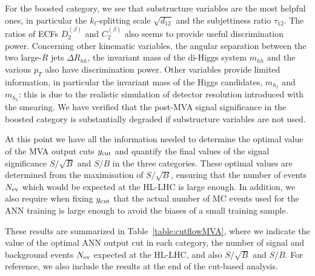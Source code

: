 For the boosted category, we see that substructure variables
are the most helpful ones, in particular the $k_t$-splitting scale
$\sqrt{d_{12}}$ and the subjettiness ratio $\tau_{12}$.
%
The ratios of ECFs $D_2^{(\beta)}$ and
$C_2^{(\beta)}$ also seems to provide
useful discrimination power.
%
Concerning other kinematic variables, the angular
separation between the two large-$R$ jets $\Delta R_{hh}$,
the invariant mass of the di-Higgs system $m_{hh}$ and the various
$p_T$ also have discrimination power.
%
Other variables provide limited information, in particular the invariant
mass of the Higgs candidates, $m_{h_1}$ and $m_{h_2}$: this
is due to the realistic
simulation of detector resolution introduced with the smearing.
%
We have verified that the post-MVA
signal significance in the boosted category is substantially
degraded if substructure variables are not used.

At this point we have all the
information needed to determine the optimal
value of the MVA output cuts $y_{\rm cut}$
and quantify the final values of the signal
significance $S/\sqrt{B}$ and $S/B$ in the three categories.
%
These optimal values are determined from the maximisation of $S/\sqrt{B}$,
ensuring that the number of events $N_{\rm ev}$
which would be expected at the HL-LHC is large
enough.
%
In addition, we also require when fixing $y_{\rm cut}$
that the actual number of MC events used for the ANN training
is large enough to avoid the biases of a small training sample.

These results are summarized in Table~\ref{table:cutflowMVA}, where we indicate
the value of the optimal ANN output
cut in each category,
the number of signal and background events $N_{\rm ev}$ expected
at the HL-LHC,
and also $S/\sqrt{B}$ and $S/B$.
%
For reference, we also include the results at the end of
the cut-based
analysis.
%

